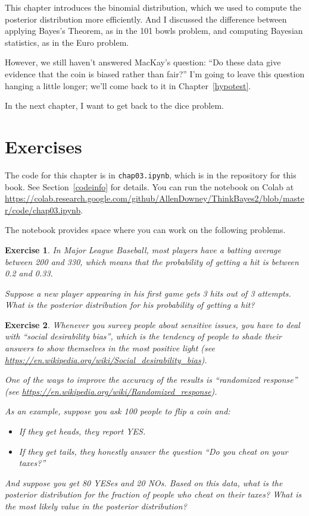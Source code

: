 \documentclass[12pt]{book}
\theoremstyle{exercise}
\newtheorem{exercise}{Exercise}[chapter]
\newcommand{\py}[1]{{\tt #1}}%
\begin{document}
This chapter introduces the binomial distribution, which we used to compute the posterior distribution more efficiently.
And I discussed the difference between applying Bayes's Theorem, as in the 101 bowls problem, and computing Bayesian statistics, as in the Euro problem.


However, we still haven't answered MacKay's question: ``Do these data give evidence that the coin is biased rather than fair?''
I'm going to leave this question hanging a little longer; we'll come back to it in Chapter~\ref{hypotest}.

In the next chapter, I want to get back to the dice problem.

\section{Exercises}

The code for this chapter is in \py{chap03.ipynb}, which is in the repository for this book.  See Section~\ref{codeinfo} for details.
You can run the notebook on Colab at \url{https://colab.research.google.com/github/AllenDowney/ThinkBayes2/blob/master/code/chap03.ipynb}.

The notebook provides space where you can work on the following problems.


\begin{exercise}
In Major League Baseball, most players have a batting average between 200 and 330, which means that the probability of getting a hit is between 0.2 and 0.33.

Suppose a new player appearing in his first game gets 3 hits out of 3 attempts.  What is the posterior distribution for his probability of getting a hit?
\end{exercise}


\begin{exercise}
Whenever you survey people about sensitive issues, you have to deal with ``social desirability bias'', which is the tendency of people to shade their answers to show themselves in the most positive light (see \url{https://en.wikipedia.org/wiki/Social_desirability_bias}).

One of the ways to improve the accuracy of the results is ``randomized response'' (see \url{https://en.wikipedia.org/wiki/Randomized_response}).

As an example, suppose you ask 100 people to flip a coin and:

\begin{itemize}

\item If they get heads, they report YES.

\item If they get tails, they honestly answer the question ``Do you cheat on your taxes?''

\end{itemize}

And suppose you get 80 YESes and 20 NOs.  Based on this data, what is the posterior distribution for the fraction of people who cheat on their taxes?  What is the most likely value in the posterior distribution?
\end{exercise}
\end{document}
